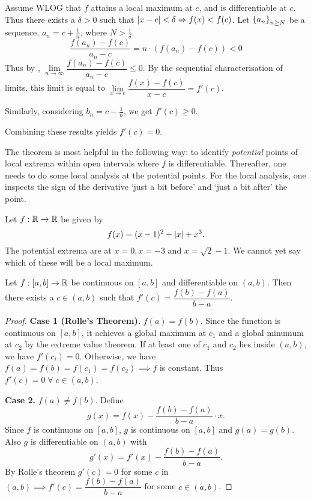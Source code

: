 
Assume WLOG that $f$ attains a local maximum at $c$, and is differentiable at $c$.
Thus there exists a $\delta > 0$ such that $\abs{x - c} < \delta \implies f(x) < f(c)$.
Let $\set{a_{n}}_{n \geq N}$ be a sequence, $a_{n} = c + \frac{1}{n}$, where $N > \frac{1}{\delta}$. \[
    \frac{f(a_{n}) - f(c)}{a_{n} - c} = n \cdot (f(a_{n}) - f(c)) < 0
\] Thus by , $\lim\limits_{n \to \infty} \dfrac{f(a_{n}) - f(c)}{a_{n} - c} \leq 0$.
By the sequential characterisation of limits, this limit is equal to $\lim\limits_{x \to c} \dfrac{f(x) - f(c)}{x - c} = f'(c)$.

Similarly, considering $b_{n} = c - \frac{1}{n}$, we get $f'(c) \geq 0$.

Combining these results yields $f'(c) = 0$.

\begin{rem}
    The theorem is most helpful in the following way: to identify \emph{potential} points of local extrema within open intervals where $f$ is differentiable.
    Thereafter, one needs to do some local analysis at the potential points.
    For the local analysis, one inspects the sign of the derivative `just a bit before' and `just a bit after' the point.
\end{rem}

\begin{example}
    Let $f : \mathbb{R} \to \mathbb{R}$ be given by \[
        f(x) = (x - 1)^{2} + \abs{x} + x^{3}.
    \] The potential extrema are at $x = 0, x = -3$ and $x = \sqrt{2} - 1$.
    We cannot yet say which of these will be a local maximum.
\end{example}

\begin{thm} \label{thm:mvt}
    Let $f : [a, b] \to \mathbb{R}$ be continuous on $[a, b]$ and differentiable on $(a, b)$.
    Then there exists a $c \in (a, b)$ such that $f'(c) = \dfrac{f(b) - f(a)}{b - a}$.
\end{thm}

\begin{proof}
    \textbf{Case 1 (Rolle's Theorem).}
    $f(a) = f(b)$.
    Since the function is continuous on $[a, b]$, it achieves a global maximum at $c_{1}$ and a global minumum at $c_{2}$ by the extreme value theorem.
    If at least one of $c_{1}$ and $c_{2}$ lies inside $(a, b)$, we have $f'(c_{i}) = 0$.
    Otherwise, we have $f(a) = f(b) = f(c_{1}) = f(c_{2}) \implies f$ is constant.
    Thus $f'(c) = 0 \;\forall\; c \in (a, b)$. 

    \textbf{Case 2.}
    $f(a) \neq f(b)$.
    Define \[
        g(x) = f(x) - \frac{f(b) - f(a)}{b - a} \cdot x.
    \] Since $f$ is continuous on $[a, b]$, $g$ is continuous on $[a, b]$ and $g(a) = g(b)$.
    Also $g$ is differentiable on $(a, b)$ with \[
        g'(x) = f'(x) - \frac{f(b) - f(a)}{b - a}.
    \] By Rolle's theorem $g'(c) = 0$ for some $c$ in $(a, b) \implies f'(c) = \dfrac{f(b) - f(a)}{b - a}$ for some $c \in (a, b)$.
\end{proof}





